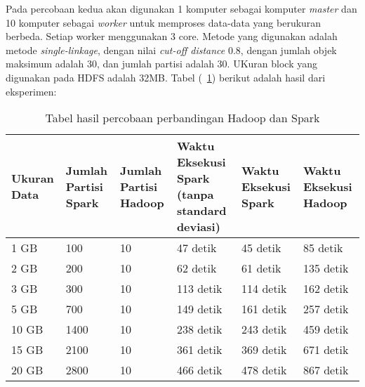 Pada percobaan kedua akan digunakan 1 komputer sebagai komputer \textit{master} dan 10 komputer sebagai \textit{worker} untuk memproses data-data yang berukuran berbeda. Setiap worker menggunakan 3 core. Metode yang digunakan adalah metode \textit{single-linkage}, dengan nilai \textit{cut-off distance} 0.8, dengan jumlah objek maksimum adalah 30, dan jumlah partisi adalah 30. UKuran block yang digunakan pada HDFS adalah 32MB. Tabel (~\ref{tab:spark10}) berikut adalah hasil dari eksperimen:

\begin{table}[H] 
	\centering 
	\caption{Tabel hasil percobaan perbandingan Hadoop dan Spark}
	\label{tab:spark10}
	\begin{tabular}{|p{1.5cm}|p{1cm}|p{1cm}|p{4cm}|p{3cm}|p{3cm}|}
\hline
Ukuran Data & Jumlah Partisi Spark & Jumlah Partisi Hadoop & Waktu Eksekusi Spark (tanpa standard deviasi) & Waktu Eksekusi Spark & Waktu Eksekusi Hadoop  \\
\hline
1 GB & 100 & 10 & 47 detik & 45 detik & 85 detik\\
\hline
2 GB & 200 & 10 & 62 detik & 61 detik & 135 detik\\
\hline
3 GB & 300 & 10 & 113 detik & 114 detik & 162 detik\\
\hline
5 GB & 700 & 10 & 149 detik & 161 detik & 257 detik\\
\hline
10 GB & 1400 & 10 & 238 detik & 243 detik & 459 detik\\
\hline
15 GB & 2100 & 10 & 361 detik & 369 detik & 671 detik\\
\hline
20 GB & 2800 & 10 & 466 detik & 478 detik & 867 detik\\
\hline

\hline
	\end{tabular} 
\end{table}

\def\scl{1}
\def\leg{} 
\def\std{none}
\def\ymin{}
\def\ymax{}

